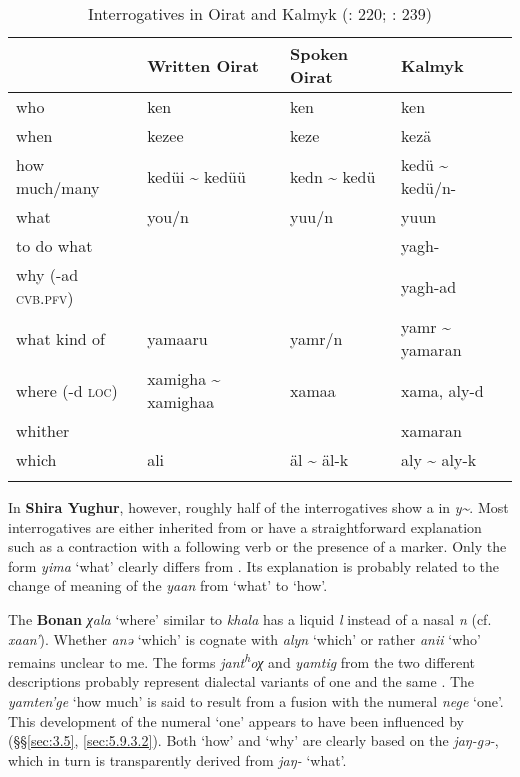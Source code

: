 \begin{table}
\caption{Interrogatives in Oirat and Kalmyk (\citealt{Birtalan2003}: 220; \citealt{Bläsing2003}: 239)}
\label{tab:mong:22}

\begin{tabularx}{\textwidth}{Xlll}
\lsptoprule
& \textbf{Written Oirat} & \textbf{Spoken Oirat} & \textbf{Kalmyk}\\
\midrule
who & ken & ken & ken\\
when & kezee & keze & kezä\\
how much/many & kedüi {\textasciitilde} kedüü & kedn {\textasciitilde} kedü & kedü {\textasciitilde} kedü/n-\\
what & you/n & yuu/n & yuun\\
to do what &  &  & yagh-\\
why (-ad \textsc{cvb.pfv}) &  &  & yagh-ad\\
what kind of & yamaaru & yamr/n & yamr {\textasciitilde} yamaran\\
where (-d \textsc{loc}) & xamigha {\textasciitilde} xamighaa & xamaa & xama, aly-d\\
whither &  &  & xamaran\\
which & ali & äl {\textasciitilde} äl-k & aly {\textasciitilde} aly-k\\
\lspbottomrule
\end{tabularx}
\end{table}

In \textbf{Shira Yughur}, however, roughly half of the interrogatives show a  in \textit{y{\textasciitilde}}. Most interrogatives are either inherited from  or have a straightforward explanation such as a contraction with a following verb or the presence of a  marker. Only the form \textit{yima} ‘what’ clearly differs from . Its explanation is probably related to the change of meaning of the  \textit{yaan} from ‘what’ to ‘how’.

The \textbf{Bonan}  \textit{χala} ‘where’ similar to  \textit{khala} has a liquid \textit{l} instead of a nasal \textit{n} (cf.  \textit{xaan’}). Whether \textit{anə} ‘which’ is cognate with  \textit{alyn} ‘which’ or rather  \textit{anii} ‘who’ remains unclear to me. The forms \textit{jant\textsuperscript{h}}\textit{oχ} and \textit{yamtig} from the two different descriptions probably represent dialectal variants of one and the same . The  \textit{yamten’ge} ‘how much’ is said to result from a fusion with the numeral \textit{nege} ‘one’. This development of the numeral ‘one’ appears to have been influenced by  (§§\ref{sec:3.5}, \ref{sec:5.9.3.2}). Both ‘how’ and ‘why’ are clearly based on the  \textit{jaŋ-gə-}, which in turn is transparently derived from \textit{jaŋ-} ‘what’.

